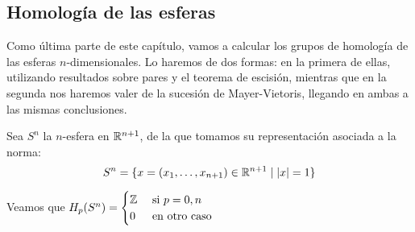 \subsection{Homología de las esferas}

Como última parte de este capítulo, vamos a calcular los grupos de homología de las esferas
$n$-dimensionales. Lo haremos de dos formas: en la primera de ellas, utilizando resultados sobre pares
y el teorema de escisión, mientras que en la segunda nos haremos valer de la sucesión de
Mayer-Vietoris, llegando en ambas a las mismas conclusiones.

\begin{theorem}
  Sea $S^n$ la $n$-esfera en $\mathbb{R}^{n+1}$, de la que tomamos su representación asociada a la norma:
  \[S^n = \{x = (x_1, \dots, x_{n+1}) \in \mathbb{R}^{n+1} \mid |x| = 1\} \]

  Veamos que $H_p(S^n) = \begin{cases}  \mathbb{Z} & \text{ si } p = 0, n \\
                                         0 & \text{ en otro caso} \end{cases}$
\end{theorem}

